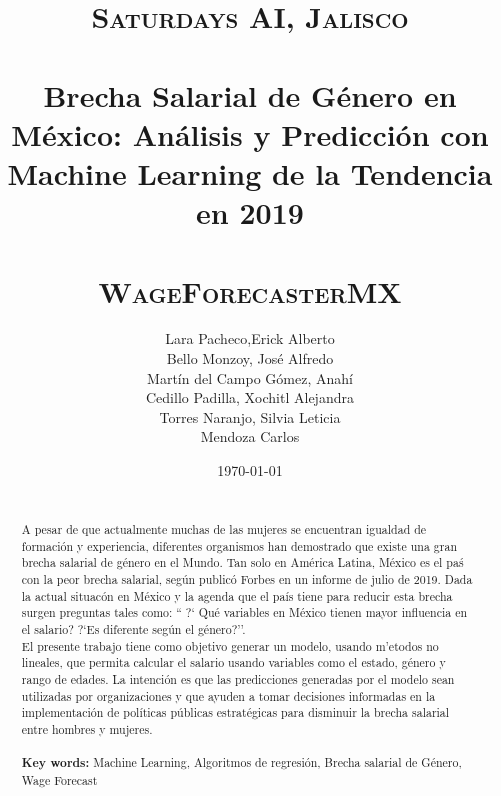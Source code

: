 \documentclass[paper=a4, fontsize=11pt]{scrartcl} %
\title{	
\normalfont \normalsize 
\textsc{Saturdays AI, Jalisco} \\ [25pt] %
\horrule{0.5pt} \\[0.4cm] %
\huge  Brecha Salarial de G\'enero en M\'exico: An\'alisis y Predicci\'on con Machine Learning de la Tendencia en 2019\\ %
\horrule{2pt} \\[0.5cm] %
\textsc{WageForecasterMX} \\ [25pt]
}
\author{  Lara Pacheco,Erick Alberto \\ Bello Monzoy, Jos\'e Alfredo \\ Mart\'in del Campo G\'omez, Anah\'i \\ Cedillo Padilla, Xochitl Alejandra \\ Torres Naranjo, Silvia Leticia \\ Mendoza Carlos} %
\date{\normalsize\today} %
\numberwithin{equation}{section} %
\numberwithin{figure}{section} %
\numberwithin{table}{section} %
\begin{document}
\maketitle %

\newpage
\begin{abstract}

{ }\\
A pesar de que actualmente muchas de las mujeres se encuentran igualdad de formaci\'on y experiencia, diferentes organismos han demostrado que existe una gran brecha salarial de g\'enero en el Mundo. Tan solo en Am\'erica Latina, México es el pa\'s con la peor brecha salarial, seg\'un public\'o Forbes en un informe de julio de 2019. Dada la actual situac\'on en M\'exico y la agenda que el pa\'is tiene para reducir esta brecha surgen preguntas tales como: `` ?` Qu\'e variables en M\'exico tienen mayor influencia en el salario? ?`Es diferente seg\'un el g\'enero?''.
\\El presente trabajo tiene como objetivo generar un modelo, usando m'etodos no lineales, que permita calcular el salario usando variables como el estado, g\'enero y rango de edades. La intenci\'on es que las predicciones generadas por el modelo sean utilizadas por organizaciones y que ayuden a tomar decisiones informadas en la implementaci\'on de pol\'iticas p\'ublicas estrat\'egicas para disminuir la brecha salarial entre hombres y mujeres.
\\
\\
\textbf{Key words:} Machine Learning, Algoritmos de regresi\'on, Brecha salarial de G\'enero, Wage Forecast
    
\end{abstract}

\newpage
\tableofcontents
\end{document}
